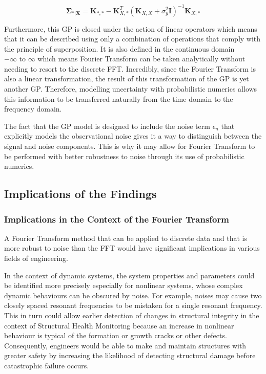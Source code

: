 \documentclass[12pt]{article}
\begin{document}
    \begin{equation}
        \boldsymbol{\Sigma}_{*\vert \mathbf{X}} = \mathbf{K}_{*,*} - \mathbf{K}_{X,*}^T (\mathbf{K}_{X,X} + \sigma^2_y \mathbf{I})^{-1} \mathbf{K}_{X,*}\label{eq:18.53}
    \end{equation}



    Furthermore, this GP is closed under the action of linear operators which means that it can be described using only a combination of operations that comply with the principle of superposition.
    It is also defined in the continuous domain $-\infty \text{ to } \infty$ which means Fourier Transform can be taken analytically without needing to resort to the discrete FFT\@.
    Incredibly, since the Fourier Transform is also a linear transformation, the result of this transformation of the GP is yet another GP\@.
    Therefore, modelling uncertainty with probabilistic numerics allows this information to be transferred naturally from the time domain to the frequency domain.

    The fact that the GP model is designed to include the noise term $\epsilon_n$ that explicitly models the observational noise gives it a way to distinguish between the signal and noise components.
    This is why it may allow for Fourier Transform to be performed with better robustness to noise through its use of probabilistic numerics.

    \subsection{Implications of the Findings}

    \subsubsection{Implications in the Context of the Fourier Transform}

    A Fourier Transform method that can be applied to discrete data and that is more robust to noise than the FFT would have significant implications in various fields of engineering.

    In the context of dynamic systems, the system properties and parameters could be identified more precisely especially for nonlinear systems, whose complex dynamic behaviours can be obscured by noise.
    For example, noises may cause two closely spaced resonant frequencies to be mistaken for a single resonant frequency.
    This in turn could allow earlier detection of changes in structural integrity in the context of Structural Health Monitoring because an increase in nonlinear behaviour is typical of the formation or growth cracks or other defects.
    Consequently, engineers would be able to make and maintain structures with greater safety by increasing the likelihood of detecting structural damage before catastrophic failure occurs.
\end{document}
